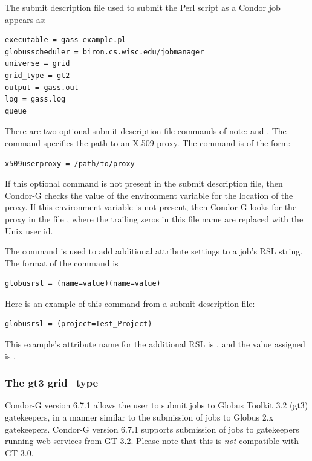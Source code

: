 The submit description file used to submit the Perl script as
a Condor job appears as:

\footnotesize
\begin{verbatim}
executable = gass-example.pl
globusscheduler = biron.cs.wisc.edu/jobmanager
universe = grid
grid_type = gt2
output = gass.out
log = gass.log
queue
\end{verbatim}
\normalsize

There are two optional submit description file commands
of note:
 and
.
The  command specifies the path to
an X.509 proxy.
The command is of the form:
\begin{verbatim}
x509userproxy = /path/to/proxy
\end{verbatim}
If this optional command is not present in the submit description file,
then Condor-G checks the value of the environment variable
 for the location of the proxy.
If this environment variable is not present, then Condor-G
looks for the proxy in the file
,
where the trailing zeros in this file name are
replaced with the Unix user id.

The  command is used to add additional
attribute settings to a job's RSL string.
The format of the  command is
\begin{verbatim}
globusrsl = (name=value)(name=value)
\end{verbatim}
Here is an example of this command from a submit description file:
\begin{verbatim}
globusrsl = (project=Test_Project)
\end{verbatim}
This example's attribute name for the additional RSL is
, and the value assigned is .

\subsubsection{\label{sec:Using-gt3}The gt3 grid\_type}

Condor-G version 6.7.1 allows the user to submit jobs
to Globus Toolkit 3.2 (gt3) gatekeepers,
in a manner similar to the submission of
jobs to Globus 2.x gatekeepers.
Condor-G version 6.7.1 supports submission of jobs to gatekeepers
running web services from GT 3.2.
Please note that this is \emph{not} compatible with GT 3.0.

